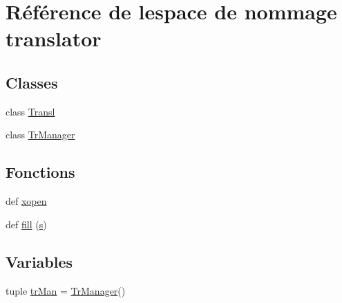 \hypertarget{namespacetranslator}{}\section{Référence de l\textquotesingle{}espace de nommage translator}
\label{namespacetranslator}
\subsection*{Classes}
\begin{DoxyCompactItemize}
\item 
class \hyperlink{classtranslator_1_1_transl}{Transl}
\item 
class \hyperlink{classtranslator_1_1_tr_manager}{Tr\+Manager}
\end{DoxyCompactItemize}
\subsection*{Fonctions}
\begin{DoxyCompactItemize}
\item 
def \hyperlink{namespacetranslator_ae0e29f78d9f93af2d1b66dc79f7ea720}{xopen}
\item 
def \hyperlink{namespacetranslator_ab1f88f7e883aa197f4f24466397ca1bc}{fill} (\hyperlink{060__command__switch_8tcl_a011c73f2dbb87635a3b4206c72355f6e}{s})
\end{DoxyCompactItemize}
\subsection*{Variables}
\begin{DoxyCompactItemize}
\item 
tuple \hyperlink{namespacetranslator_ace299b686ba7d0106999fe666cba48a8}{tr\+Man} = \hyperlink{classtranslator_1_1_tr_manager}{Tr\+Manager}()
\end{DoxyCompactItemize}


